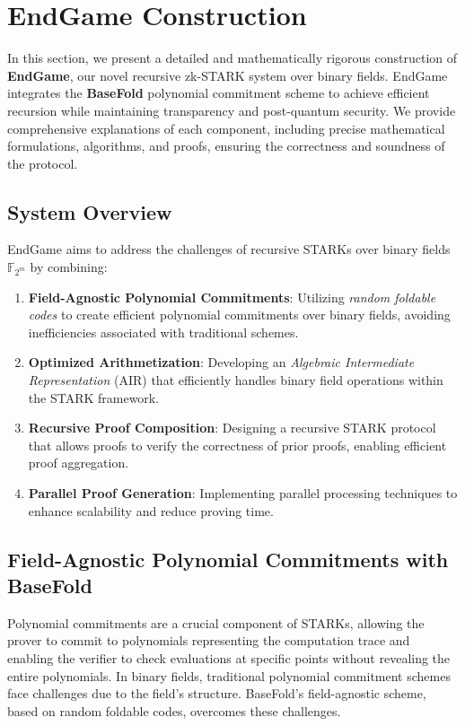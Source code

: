 \documentclass{article}
\theoremstyle{plain}
\theoremstyle{definition}
\theoremstyle{remark}
\theoremstyle{problem}
\begin{document}
\section{EndGame Construction}

In this section, we present a detailed and mathematically rigorous construction of \textbf{EndGame}, our novel recursive zk-STARK system over binary fields. EndGame integrates the \textbf{BaseFold} polynomial commitment scheme to achieve efficient recursion while maintaining transparency and post-quantum security. We provide comprehensive explanations of each component, including precise mathematical formulations, algorithms, and proofs, ensuring the correctness and soundness of the protocol.


\subsection{System Overview}

EndGame aims to address the challenges of recursive STARKs over binary fields $\mathbb{F}_{2^m}$ by combining:

\begin{enumerate}
    \item \textbf{Field-Agnostic Polynomial Commitments}: Utilizing \emph{random foldable codes} to create efficient polynomial commitments over binary fields, avoiding inefficiencies associated with traditional schemes.
    \item \textbf{Optimized Arithmetization}: Developing an \emph{Algebraic Intermediate Representation} (AIR) that efficiently handles binary field operations within the STARK framework.
    \item \textbf{Recursive Proof Composition}: Designing a recursive STARK protocol that allows proofs to verify the correctness of prior proofs, enabling efficient proof aggregation.
    \item \textbf{Parallel Proof Generation}: Implementing parallel processing techniques to enhance scalability and reduce proving time.
\end{enumerate}

\subsection{Field-Agnostic Polynomial Commitments with BaseFold}

Polynomial commitments are a crucial component of STARKs, allowing the prover to commit to polynomials representing the computation trace and enabling the verifier to check evaluations at specific points without revealing the entire polynomials. In binary fields, traditional polynomial commitment schemes face challenges due to the field's structure. BaseFold's field-agnostic scheme, based on random foldable codes, overcomes these challenges.
\end{document}
